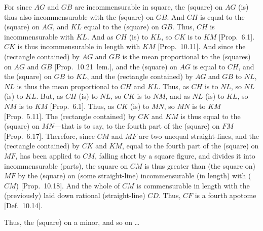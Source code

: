 \begin{Parallel}{}{}
{For since $AG$ and $GB$ are incommensurable in square, the (square)
on $AG$ (is) thus also incommensurable with the (square) on $GB$.
And $CH$ is equal to the (square) on $AG$, and $KL$ equal to the (square) on $GB$. Thus, $CH$ is incommensurable with $KL$. And as $CH$ (is) to
$KL$, so $CK$ is to $KM$ [Prop.~6.1]. 
$CK$ is thus incommensurable in length with $KM$ [Prop.~10.11]. And since the (rectangle contained)
by $AG$ and $GB$ is the mean proportional to the (squares) on $AG$
and $GB$ [Prop.~10.21~lem.], and the
(square) on $AG$ is equal to $CH$, and the (square) on $GB$ to $KL$,
and the (rectangle contained) by $AG$ and $GB$ to $NL$, $NL$
is thus the mean proportional to $CH$ and $KL$. Thus, as $CH$
is to $NL$, so $NL$ (is) to $KL$. But, as $CH$ (is) to $NL$, so
$CK$ is to $NM$, and as $NL$ (is) to $KL$, so $NM$ is to $KM$ [Prop.~6.1]. Thus, as $CK$ (is) to $MN$, so
$MN$ is to $KM$ [Prop.~5.11]. The (rectangle
contained) by $CK$ and $KM$ is thus equal to the (square) on $MN$---that is to say, to the fourth part of the (square) on $FM$ [Prop.~6.17]. Therefore, since $CM$ and $MF$ are two unequal straight-lines, and the (rectangle contained) by $CK$ and
$KM$, equal to the fourth part of the (square) on $MF$, has been applied
to $CM$, falling short by a square figure, and divides it into incommensurable (parts), the square on $CM$ is thus greater than (the
square on) $MF$ by the (square) on (some straight-line) incommensurable
(in length) with ($CM$) [Prop.~10.18]. 
And the whole of $CM$ is commensurable in length with the (previously)
laid down rational (straight-line) $CD$. Thus, $CF$ is a fourth apotome
[Def.~10.14].

Thus, the (square) on a minor, and so on \ldots}
\end{Parallel}

